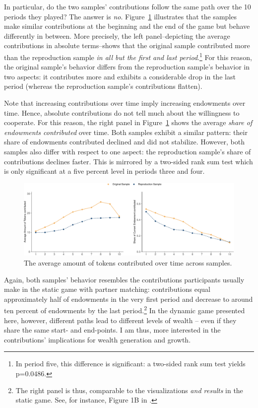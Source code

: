 \documentclass[
  authoryear,
  review,
  3p,
  onecolumn]{elsarticle}
\begin{document}
In particular, do the two samples' contributions follow the same path
over the 10 periods they played? The answer is \emph{no}.
Figure~\ref{fig-share-of-contributions} illustrates that the samples
make similar contributions at the beginning and the end of the game but
behave differently in between. More precisely, the left panel--depicting
the average contributions in absolute terms--shows that the original
sample contributed more than the reproduction sample \emph{in all but
the first and last period}.\footnote{In period five, this difference is
  significant: a two-sided rank sum test yields p=0.0486.} For this
reason, the original sample's behavior differs from the reproduction
sample's behavior in two aspects: it contributes more and exhibits a
considerable drop in the last period (whereas the reproduction sample's
contributions flatten).

Note that increasing contributions over time imply increasing endowments
over time. Hence, absolute contributions do not tell much about the
willingness to cooperate. For this reason, the right panel in
Figure~\ref{fig-share-of-contributions} shows the average \emph{share of
endowments contributed} over time. Both samples exhibit a similar
pattern: their share of endowments contributed declined and did not
stabilize. However, both samples also differ with respect to one aspect:
the reproduction sample's share of contributions declines faster. This
is mirrored by a two-sided rank sum test which is only significant at a
five percent level in periods three and four.

\begin{figure}

{\centering \includegraphics{paper_files/figure-pdf/fig-share-of-contributions-1.pdf}

}

\caption{\label{fig-share-of-contributions}The average amount of tokens
contributed over time across samples.}

\end{figure}

Again, both samples' behavior resembles the contributions participants
usually make in the static game with partner matching: contributions
equal approximately half of endowments in the very first period and
decrease to around ten percent of endowments by the last
period.\footnote{The right panel is thus, comparable to the
  visualizations \emph{and results} in the static game. See, for
  instance, Figure 1B in \citet[p.986]{fehrgaechter2000}.} In the
dynamic game presented here, however, different paths lead to different
levels of wealth -- even if they share the same start- and end-points. I
am thus, more interested in the contributions' implications for wealth
generation and growth.
\end{document}
